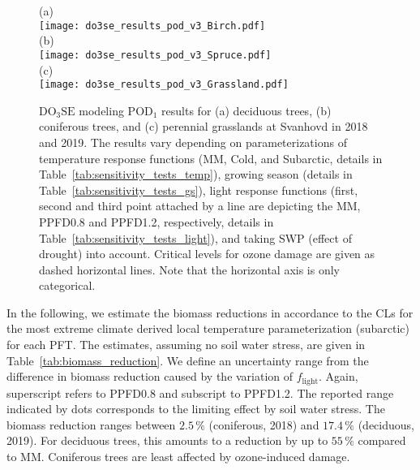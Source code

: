 \documentclass[bg, manuscript]{copernicus}
\begin{document}
\begin{figure}[t]
  \centering
  (a)\\
  \texttt{[image: do3se\_results\_pod\_v3\_Birch.pdf]}\\
  (b)\\
  \texttt{[image: do3se\_results\_pod\_v3\_Spruce.pdf]}\\
  (c)\\
  \texttt{[image: do3se\_results\_pod\_v3\_Grassland.pdf]}
  \caption{$\mathrm{DO_3SE}$ modeling $\mathrm{POD_1}$ results for (a) deciduous trees, (b) coniferous trees, and (c) perennial grasslands at Svanhovd in 2018 and 2019. The results vary depending on parameterizations of temperature response functions (MM, Cold, and Subarctic, details in Table~\ref{tab:sensitivity_tests_temp}), growing season (details in Table~\ref{tab:sensitivity_tests_gs}), light response functions (first, second and third point attached by a line are depicting the MM, PPFD0.8 and PPFD1.2, respectively, details in Table~\ref{tab:sensitivity_tests_light}), and taking SWP (effect of drought) into account. Critical levels for ozone damage \citep{ICP:MappingManual2017,ESPR:Hayes2021} are given as dashed horizontal lines. Note that the horizontal axis is only categorical.}
  \label{fig:pody_rel}
\end{figure}

In the following, we estimate the biomass reductions in accordance to the CLs \citep{ICP:MappingManual2017, ESPR:Hayes2021} for the most extreme climate derived local temperature parameterization (subarctic) for each PFT. The estimates, assuming no soil water stress, are given in Table~\ref{tab:biomass_reduction}. We define an uncertainty range from the difference in biomass reduction caused by the variation of $f_\mathrm{light}$. Again, superscript refers to PPFD0.8 and subscript to PPFD1.2. The reported range indicated by dots corresponds to the limiting effect by soil water stress. The biomass reduction ranges between $2.5\,\unit{\%}$ (coniferous, 2018) and $17.4\,\unit{\%}$ (deciduous, 2019). For deciduous trees, this amounts to a reduction by up to $55\,\unit{\%}$ compared to MM. Coniferous trees are least affected by ozone-induced damage.
\end{document}
